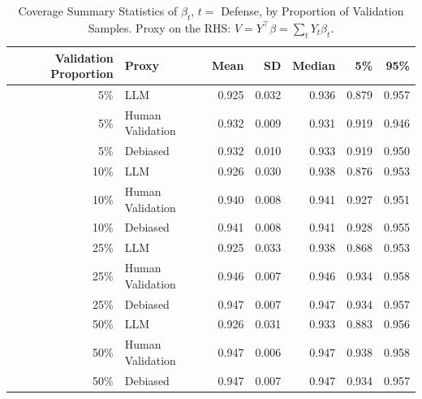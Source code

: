 \begin{table}

\caption{Coverage Summary Statistics of $\beta_{t}$, $t=$ Defense, by Proportion of Validation Samples.
      Proxy on the RHS: $V = Y^\top \beta = \sum_{t} Y_t \beta_t$.}
\centering
\begin{tabular}[t]{rlrrrrr}
\toprule
Validation Proportion & Proxy & Mean & SD & Median & 5\% & 95\%\\
\midrule
5\% & LLM & 0.925 & 0.032 & 0.936 & 0.879 & 0.957\\
5\% & Human Validation & 0.932 & 0.009 & 0.931 & 0.919 & 0.946\\
5\% & Debiased & 0.932 & 0.010 & 0.933 & 0.919 & 0.950\\
10\% & LLM & 0.926 & 0.030 & 0.938 & 0.876 & 0.953\\
10\% & Human Validation & 0.940 & 0.008 & 0.941 & 0.927 & 0.951\\
10\% & Debiased & 0.941 & 0.008 & 0.941 & 0.928 & 0.955\\
25\% & LLM & 0.925 & 0.033 & 0.938 & 0.868 & 0.953\\
25\% & Human Validation & 0.946 & 0.007 & 0.946 & 0.934 & 0.958\\
25\% & Debiased & 0.947 & 0.007 & 0.947 & 0.934 & 0.957\\
50\% & LLM & 0.926 & 0.031 & 0.933 & 0.883 & 0.956\\
50\% & Human Validation & 0.947 & 0.006 & 0.947 & 0.938 & 0.958\\
50\% & Debiased & 0.947 & 0.007 & 0.947 & 0.934 & 0.957\\
\bottomrule
\end{tabular}
\end{table}
